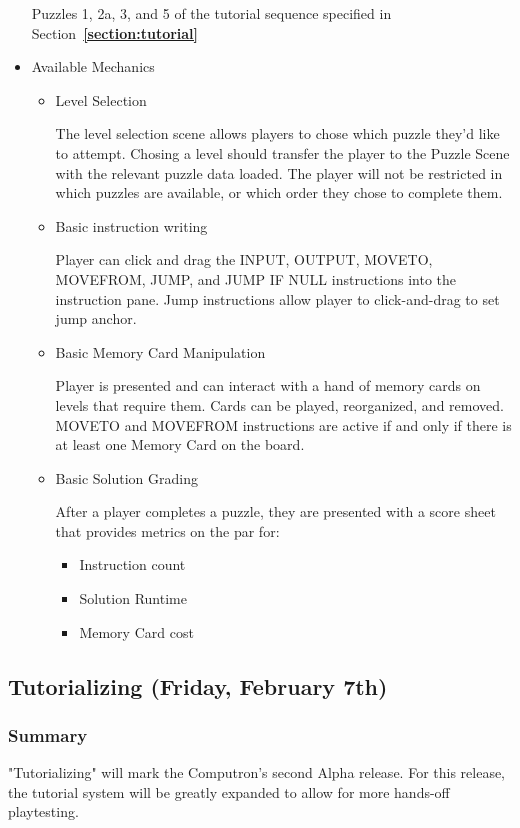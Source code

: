 \begin{itemize}
  Puzzles 1, 2a, 3, and 5 of the tutorial sequence specified in Section~\textbf{\ref{section:tutorial}}

  \item Available Mechanics
  \begin{itemize}
    \item Level Selection
    
    The level selection scene allows players to chose which puzzle they'd like to attempt. Chosing a level should transfer the player to the Puzzle Scene with the relevant puzzle data loaded. The player will not be restricted in which puzzles are available, or which order they chose to complete them.

    \item Basic instruction writing
    
    Player can click and drag the INPUT, OUTPUT, MOVETO, MOVEFROM, JUMP, and JUMP IF NULL instructions into the instruction pane. Jump instructions allow player to click-and-drag to set jump anchor.

    \item Basic Memory Card Manipulation
    
    Player is presented and can interact with a hand of memory cards on levels that require them. Cards can be played, reorganized, and removed. MOVETO and MOVEFROM instructions are active if and only if there is at least one Memory Card on the board.

    \item Basic Solution Grading
    
    After a player completes a puzzle, they are presented with a score sheet that provides metrics on the par for:
    \begin{itemize}
      \item Instruction count
      \item Solution Runtime
      \item Memory Card cost
    \end{itemize}
  \end{itemize}
\end{itemize}

\subsection{Tutorializing (Friday, February 7th)}

\subsubsection*{Summary}
"Tutorializing" will mark the Computron's second Alpha release. For this release, the tutorial system will be greatly expanded to allow for more hands-off playtesting.

